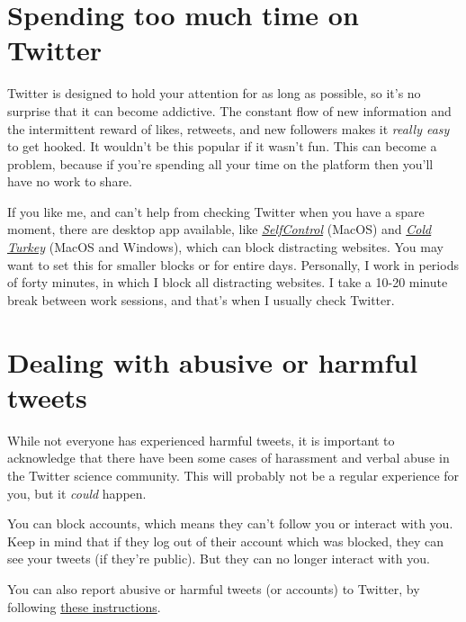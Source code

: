 \documentclass[]{book}
\begin{document}
\hypertarget{spending-too-much-time-on-twitter}{%
\section{Spending too much time on Twitter}\label{spending-too-much-time-on-twitter}}

Twitter is designed to hold your attention for as long as possible, so it's no surprise that it can become addictive. The constant flow of new information and the intermittent reward of likes, retweets, and new followers makes it \emph{really easy} to get hooked. It wouldn't be this popular if it wasn't fun. This can become a problem, because if you're spending all your time on the platform then you'll have no work to share.

If you like me, and can't help from checking Twitter when you have a spare moment, there are desktop app available, like \href{https://selfcontrolapp.com/}{\emph{SelfControl}} (MacOS) and \href{https://getcoldturkey.com/}{\emph{Cold Turkey}} (MacOS and Windows), which can block distracting websites. You may want to set this for smaller blocks or for entire days. Personally, I work in periods of forty minutes, in which I block all distracting websites. I take a 10-20 minute break between work sessions, and that's when I usually check Twitter.

\hypertarget{dealing-with-abusive-or-harmful-tweets}{%
\section{Dealing with abusive or harmful tweets}\label{dealing-with-abusive-or-harmful-tweets}}

While not everyone has experienced harmful tweets, it is important to acknowledge that there have been some cases of harassment and verbal abuse in the Twitter science community. This will probably not be a regular experience for you, but it \emph{could} happen.

You can block accounts, which means they can't follow you or interact with you. Keep in mind that if they log out of their account which was blocked, they can see your tweets (if they're public). But they can no longer interact with you.

You can also report abusive or harmful tweets (or accounts) to Twitter, by following \href{https://help.twitter.com/en/safety-and-security/report-abusive-behavior}{these instructions}.


\end{document}
